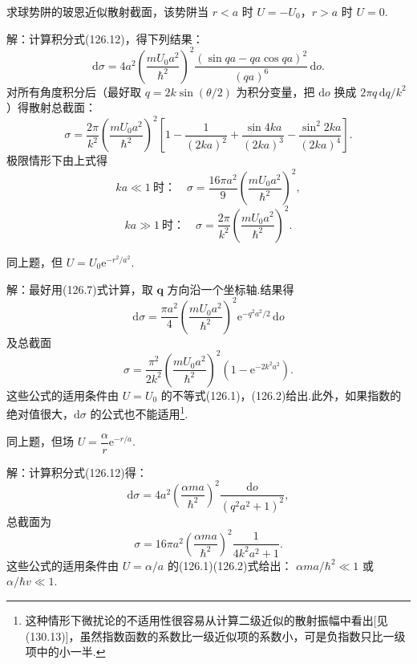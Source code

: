 \begin{xiti}

\quad 求球势阱的玻恩近似散射截面，该势阱当 $r<a$ 时 $U=-U_0$，$r>a$ 时 $U=0$.

解：计算积分式(126.12)，得下列结果：
\begin{equation*}
  \mathrm{d}\sigma=4a^2\left(\frac{mU_0a^2}{\hbar^2}\right)^2
  \frac{\left(\sin qa-qa\cos qa\right)^2}{(qa)^6}\,\mathrm{d}o.
\end{equation*}
对所有角度积分后（最好取 $q=2k\sin(\theta/2)$ 为积分变量，把 $\mathrm{d}o$ 换成 $2\pi q\,\mathrm{d}q/k^2$）得散射总截面：
\begin{equation*}
  \sigma=\frac{2\pi}{k^2}\left(\frac{mU_0a^2}{\hbar^2}\right)^2
  \left[1-\frac{1}{(2ka)^2}+\frac{\sin 4ka}{(2ka)^3}
  -\frac{\sin^2 2ka}{(2ka)^4}\right].
\end{equation*}
极限情形下由上式得
\begin{equation*}
  ka\ll1\ \text{时：}\quad
  \sigma=\frac{16\pi a^2}{9}\left(\frac{mU_0a^2}{\hbar^2}\right)^2,
\end{equation*}
\begin{equation*}
  ka\gg1\ \text{时：}\quad
  \sigma=\frac{2\pi}{k^2}\left(\frac{mU_0a^2}{\hbar^2}\right)^2.
\end{equation*}

\quad 同上题，但 $U=U_0\mathrm{e}^{-r^2/a^2}$.

解：最好用(126.7)式计算，取 $\boldsymbol{q}$ 方向沿一个坐标轴.结果得
\begin{equation*}
  \mathrm{d}\sigma=\frac{\pi a^2}{4}\left(\frac{mU_0a^2}{\hbar^2}\right)^2
  \mathrm{e}^{-q^2a^2/2}\,\mathrm{d}o
\end{equation*}
及总截面
\begin{equation*}
  \sigma=\frac{\pi^2}{2k^2}\left(\frac{mU_0a^2}{\hbar^2}\right)^2
  \left(1-\mathrm{e}^{-2k^2a^2}\right).
\end{equation*}
这些公式的适用条件由 $U=U_0$ 的不等式(126.1)，(126.2)给出.此外，如果指数的绝对值很大，$\mathrm{d}\sigma$ 的公式也不能适用\footnote{这种情形下微扰论的不适用性很容易从计算二级近似的散射振幅中看出[见(130.13)]，虽然指数函数的系数比一级近似项的系数小，可是负指数只比一级项中的小一半.}.

\quad 同上题，但场 $U=\dfrac{\alpha}{r}\mathrm{e}^{-r/a}$.

解：计算积分式(126.12)得：
\begin{equation*}
  \mathrm{d}\sigma=4a^2\left(\frac{\alpha ma}{\hbar^2}\right)^2
  \frac{\mathrm{d}o}{\left(q^2a^2+1\right)^2},
\end{equation*}
总截面为
\begin{equation*}
  \sigma=16\pi a^2\left(\frac{\alpha ma}{\hbar^2}\right)^2
  \frac{1}{4k^2a^2+1}.
\end{equation*}
这些公式的适用条件由 $U=\alpha/a$ 的(126.1)(126.2)式给出：
$\alpha ma/\hbar^2\ll1$ 或 $\alpha/\hbar v\ll1$.


\end{xiti}
